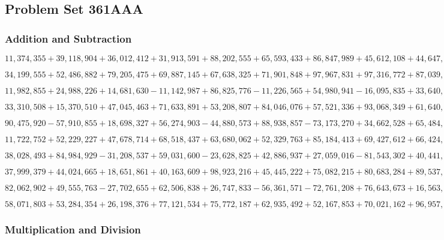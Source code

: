 \hypertarget{problem-set-361aaa}{%
\subsection{Problem Set 361AAA}\label{problem-set-361aaa}}

\hypertarget{addition-and-subtraction}{%
\subsubsection{Addition and
Subtraction}\label{addition-and-subtraction}}

\(11,374,355+39,118,904+36,012,412+31,913,591+88,202,555+65,593,433+86,847,989+45,612,108+44,647,775+28,950,871\)

\(34,199,555+52,486,882+79,205,475+69,887,145+67,638,325+71,901,848+97,967,831+97,316,772+87,039,426+51,821,782\)

\(11,982,855+24,988,226+14,681,630-11,142,987+86,825,776-11,226,565+54,980,941-16,095,835+33,640,352-87,666,624\)

\(33,310,508+15,370,510+47,045,463+71,633,891+53,208,807+84,046,076+57,521,336+93,068,349+61,640,035+97,144,255\)

\(90,475,920-57,910,855+18,698,327+56,274,903-44,880,573+88,938,857-73,173,270+34,662,528+65,484,880-48,506,726\)

\(11,722,752+52,229,227+47,678,714+68,518,437+63,680,062+52,329,763+85,184,413+69,427,612+66,424,336+78,146,105\)

\(38,028,493+84,984,929-31,208,537+59,031,600-23,628,825+42,886,937+27,059,016-81,543,302+40,441,28÷85,781,393\)

\(37,999,379+44,024,665+18,651,861+40,163,609+98,923,216+45,445,222+75,082,215+80,683,284+89,537,447+68,549,444\)

\(82,062,902+49,555,763-27,702,655+62,506,838+26,747,833-56,361,571-72,761,208+76,643,673+16,563,823-88,365,237\)

\(58,071,803+53,284,354+26,198,376+77,121,534+75,772,187+62,935,492+52,167,853+70,021,162+96,957,310+34,874,973\)

\hypertarget{multiplication-and-division}{%
\subsubsection{Multiplication and
Division}\label{multiplication-and-division}}


